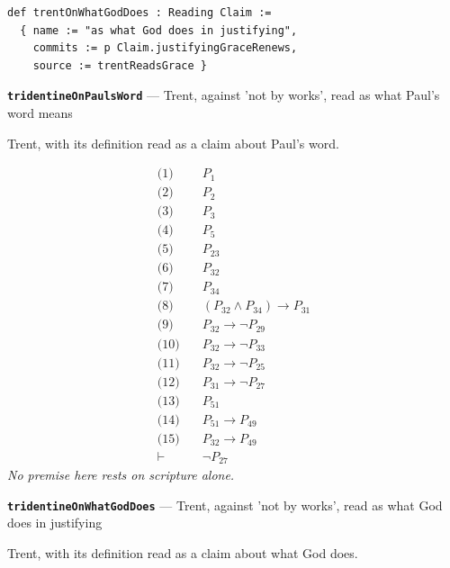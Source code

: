 \documentclass[11pt]{article}
\begin{document}
{\small\begin{verbatim}
def trentOnWhatGodDoes : Reading Claim :=
  { name := "as what God does in justifying",
    commits := p Claim.justifyingGraceRenews,
    source := trentReadsGrace }
\end{verbatim}}
\par\medskip\noindent\textbf{\texttt{tridentine\allowbreak{}On\allowbreak{}Pauls\allowbreak{}Word}} --- Trent, against 'not by works', read as what Paul's word means\par\nobreak\noindent
Trent, with its definition read as a claim about Paul's word.

\begin{align*}
  \text{(1)} \quad & P_{1} \\
  \text{(2)} \quad & P_{2} \\
  \text{(3)} \quad & P_{3} \\
  \text{(4)} \quad & P_{5} \\
  \text{(5)} \quad & P_{23} \\
  \text{(6)} \quad & P_{32} \\
  \text{(7)} \quad & P_{34} \\
  \text{(8)} \quad & (P_{32} \land P_{34}) \rightarrow P_{31} \\
  \text{(9)} \quad & P_{32} \rightarrow \lnot P_{29} \\
  \text{(10)} \quad & P_{32} \rightarrow \lnot P_{33} \\
  \text{(11)} \quad & P_{32} \rightarrow \lnot P_{25} \\
  \text{(12)} \quad & P_{31} \rightarrow \lnot P_{27} \\
  \text{(13)} \quad & P_{51} \\
  \text{(14)} \quad & P_{51} \rightarrow P_{49} \\
  \text{(15)} \quad & P_{32} \rightarrow P_{49} \\
  \vdash \quad & \lnot P_{27}
\end{align*}
\emph{No premise here rests on scripture alone.}
\par\medskip\noindent\textbf{\texttt{tridentine\allowbreak{}On\allowbreak{}What\allowbreak{}God\allowbreak{}Does}} --- Trent, against 'not by works', read as what God does in justifying\par\nobreak\noindent
Trent, with its definition read as a claim about what God does.
\end{document}
